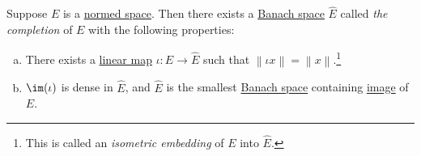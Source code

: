 \begin{theorem}[Completion]\label{thm:completion-of-Banach-space}
	Suppose \(E\) is a \hyperref[def:normed-vector-space]{normed space}. Then there exists a \hyperref[def:Banach-space]{Banach space} \(\hat{E} \) called \emph{the completion} of \(E\) with the following properties:
	\begin{enumerate}[(a)]
		\item There exists a \hyperref[def:linear-map]{linear map} \(\iota \colon E \to \hat{E}\) such that \(\left\lVert \iota x\right\rVert = \left\lVert x\right\rVert \).\footnote{This is called an \emph{isometric embedding} of \(E\) into \(\hat{E} \).}
		\item \(\im(\iota )\) is dense in \(\hat{E} \), and \(\hat{E} \) is the smallest \hyperref[def:Banach-space]{Banach space} containing \hyperref[def:image]{image} of \(E\).
	\end{enumerate}
\end{theorem}